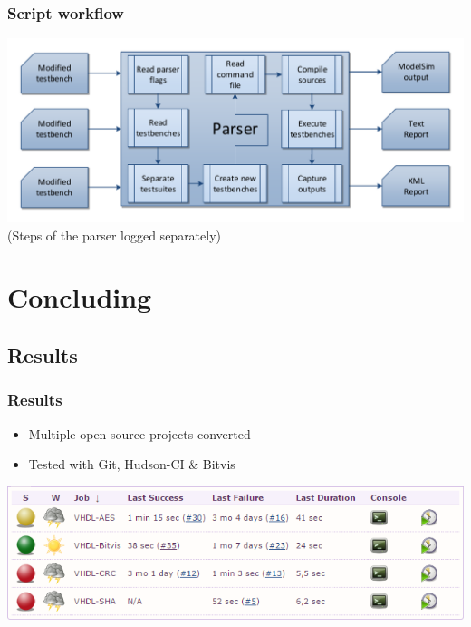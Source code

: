 \documentclass[british,10pt]{beamer}
\begin{document}
\begin{frame}\frametitle{Script workflow}
\includegraphics[width=\textwidth]{images/parserwork.pdf}
\newline{}
\centering(Steps of the parser logged separately)
\end{frame}




\section{Concluding}

\subsection{Results}
\begin{frame}\frametitle{Results}
\begin{itemize}
\item Multiple open-source projects converted
\item Tested with Git, Hudson-CI \& Bitvis
\end{itemize}
\medskip
{\centering
\includegraphics[width=\textwidth]{images/jobs.png}}
\end{frame}
\end{document}
